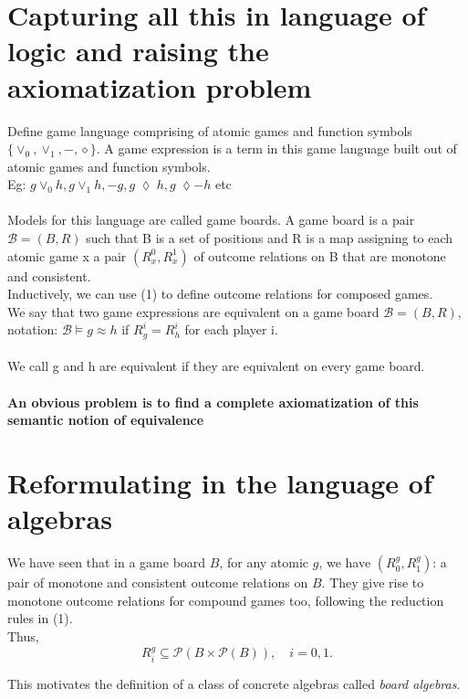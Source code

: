 \documentclass[12pt]{article}
\begin{document}
\section{Capturing all this in language of logic and raising the axiomatization problem}
Define game language comprising of atomic games and function symbols $\{\vee_{0},\vee_{1},-,\diamond\}$. A game expression is a term in this game language built out of atomic games and function symbols. \\
Eg: $g \vee_{0}h, g \vee_{1} h, -g, g\; \lozenge \; h, g\; \lozenge -h$ etc \\ \\
Models for this language are called game boards. A game board is a pair $\mathcal{B}=(B,R)$ such that B is a set of positions and R is a map assigning to each atomic game x a pair $(R^{0}_{x}, R^{1}_{x})$ of outcome relations on B that are monotone and consistent. \\
Inductively, we can use (1) to define outcome relations for composed games. \\
We say that two game expressions are equivalent on a game board $\mathcal{B}=(B,R)$, notation: $\mathcal{B} \vDash g \approx h$ if $R^{i}_{g}=R^{i}_{h}$ for each player i. \\ \\
We call g and h are equivalent if they are equivalent on every game board. \\ \\
\textbf{An obvious problem is to find a complete axiomatization of this semantic notion of equivalence}
\section{Reformulating in the language of algebras}
We have seen that in a game board $B$, for any atomic $g$, we have 
$(R^g_0, R^g_1)$: a pair of monotone and consistent outcome relations on $B$. 
They give rise to monotone outcome relations for compound games too, 
following the reduction rules in (1).\\
Thus,
\[
R^g_i \subseteq \mathcal{P}(B \times \mathcal{P}(B)), \quad i = 0,1.
\]

This motivates the definition of a class of concrete algebras 
called \emph{board algebras}.
\end{document}
